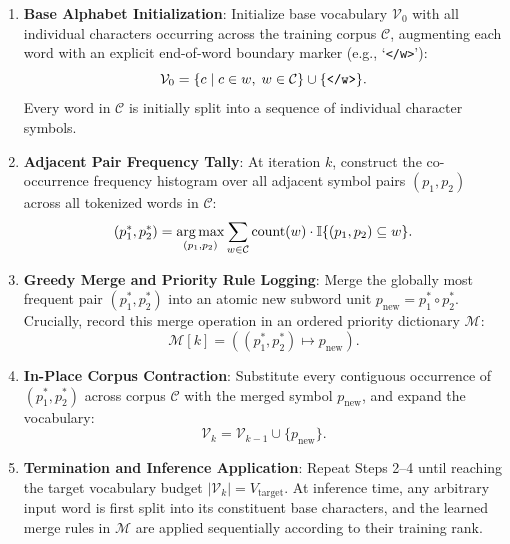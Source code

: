 \documentclass[../../main.tex]{subfiles}
\begin{document}
\begin{enumerate}
    \item \textbf{Base Alphabet Initialization}: Initialize base vocabulary $\mathcal{V}_0$ with all individual characters occurring across the training corpus $\mathcal{C}$, augmenting each word with an explicit end-of-word boundary marker (e.g., `\texttt{</w>}'):
    \begin{equation}
    \label{eq:bpe_init_vocab}
    \mathcal{V}_0 = \{c \mid c \in w, \; w \in \mathcal{C}\} \cup \{\text{\texttt{</w>}}\}.
    \end{equation}
    Every word in $\mathcal{C}$ is initially split into a sequence of individual character symbols.
    
    \item \textbf{Adjacent Pair Frequency Tally}: At iteration $k$, construct the co-occurrence frequency histogram over all adjacent symbol pairs $(p_1, p_2)$ across all tokenized words in $\mathcal{C}$:
    \begin{equation}
    \label{eq:bpe_pair_freq}
    (p_1^*, p_2^*) = \operatorname*{\mathrm{arg\,max}}_{(p_1, p_2)} \sum_{w \in \mathcal{C}} \text{count}(w) \cdot \mathbb{I}\{(p_1, p_2) \subseteq w\}.
    \end{equation}
    
    \item \textbf{Greedy Merge and Priority Rule Logging}: Merge the globally most frequent pair $(p_1^*, p_2^*)$ into an atomic new subword unit $p_{\text{new}} = p_1^* \circ p_2^*$. Crucially, record this merge operation in an ordered priority dictionary $\mathcal{M}$:
    \begin{equation}
    \label{eq:bpe_merge_rule}
    \mathcal{M}[k] = ((p_1^*, p_2^*) \mapsto p_{\text{new}}).
    \end{equation}
    
    \item \textbf{In-Place Corpus Contraction}: Substitute every contiguous occurrence of $(p_1^*, p_2^*)$ across corpus $\mathcal{C}$ with the merged symbol $p_{\text{new}}$, and expand the vocabulary:
    \begin{equation}
    \label{eq:bpe_vocab_update}
    \mathcal{V}_k = \mathcal{V}_{k-1} \cup \{p_{\text{new}}\}.
    \end{equation}
    
    \item \textbf{Termination and Inference Application}: Repeat Steps 2--4 until reaching the target vocabulary budget $|\mathcal{V}_k| = V_{\text{target}}$. At inference time, any arbitrary input word is first split into its constituent base characters, and the learned merge rules in $\mathcal{M}$ are applied sequentially according to their training rank.
\end{enumerate}
\end{document}
